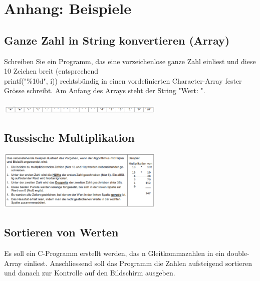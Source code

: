 \newpage
\section{Anhang: Beispiele}
	\subsection{Ganze Zahl in String konvertieren (Array)} 
		Schreiben Sie ein Programm, das eine vorzeichenlose ganze Zahl einliest und diese 10 Zeichen breit (entsprechend\\ printf("\%10d", i)) rechtsbündig in einen vordefinierten Character-Array fester Grösse schreibt. Am Anfang des Arrays steht der String "Wert: ".\\\\ 
		\includegraphics[width=0.6\textwidth]{pics/bsp1.png}
		
\newpage
	\subsection	{Russische Multiplikation}
		\includegraphics[width=0.6\textwidth]{pics/bsp2.png}
		
\newpage
	\subsection	{Sortieren von Werten}
			Es soll ein C-Programm erstellt werden, das n Gleitkommazahlen in ein double-Array einliest. Anschliessend soll	das	Programm die Zahlen	aufsteigend	sortieren und danach zur Kontrolle auf den Bildschirm ausgeben.
			
		
		